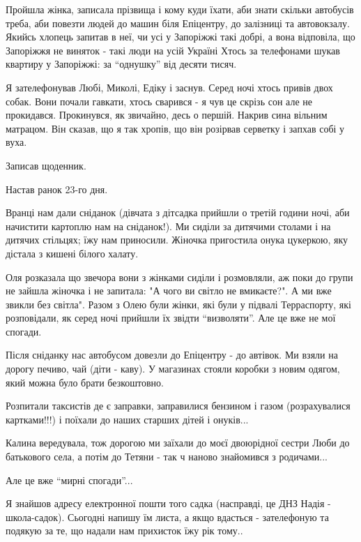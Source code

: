 Пройшла жінка, записала прізвища і кому куди їхати, аби знати скільки автобусів
треба, аби повезти людей до машин біля Епіцентру, до залізниці та автовокзалу.
Якийсь хлопець запитав в неї, чи усі у Запоріжжі такі добрі, а вона відповіла,
що Запоріжжя не виняток - такі люди на усій Україні  Хтось за телефонами шукав
квартиру у Запоріжжі: за \enquote{однушку} від десяти тисяч. 

Я зателефонував Любі, Миколі, Едіку і заснув. Серед ночі хтось привів двох
собак. Вони почали гавкати, хтось сварився - я чув це скрізь сон але не
прокидався. Прокинувся, як звичайно, десь о першій. Накрив сина вільним
матрацом. Він сказав, що я так хропів, що він розірвав серветку і запхав собі у
вуха. 

Записав щоденник.

Настав ранок 23-го дня.

Вранці нам дали сніданок (дівчата з дітсадка прийшли о третій години ночі, аби
начистити картоплю нам на сніданок!). Ми сиділи за дитячими столами і на
дитячих стільцях; їжу нам приносили. Жіночка пригостила онука цукеркою, яку
дістала з кишені білого халату. 

Оля розказала що звечора вони з жінками сиділи і розмовляли, аж поки до групи
не зайшла жіночка і не запитала: "А чого ви світло не вмикаєте?". А ми  вже
звикли без світла". Разом з Олею були жінки, які були у підвалі Терраспорту,
які розповідали, як серед ночі прийшли їх звідти \enquote{визволяти}. Але це вже не мої
спогади.  

Після сніданку нас автобусом довезли до Епіцентру - до автівок. Ми взяли на
дорогу печиво, чай (діти - каву). У магазинах стояли коробки з новим одягом,
який можна було брати безкоштовно.  

Розпитали таксистів де є заправки, заправилися бензином і газом (розрахувалися
картками!!!) і поїхали до наших старших дітей і онуків... 

Калина вередувала, тож дорогою ми заїхали до моєї двоюрідної сестри Люби до
батькового села, а потім до Тетяни - так ч наново знайомився з родичами...

Але це вже \enquote{мирні спогади}...

Я знайшов адресу електронної пошти того садка (насправді, це ДНЗ Надія -
школа-садок). Сьогодні напишу їм листа, а якщо вдасться - зателефоную та
подякую за те, що надали нам прихисток їжу рік тому..

